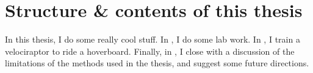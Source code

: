 \section{Structure \& contents of this thesis}
In this thesis, I do some really cool stuff.
%
In , I do some lab work.
%
In , I train a velociraptor to ride a hoverboard.
%
Finally, in , I close with a discussion of the
limitations of the methods used in the thesis, and suggest some future
directions.

